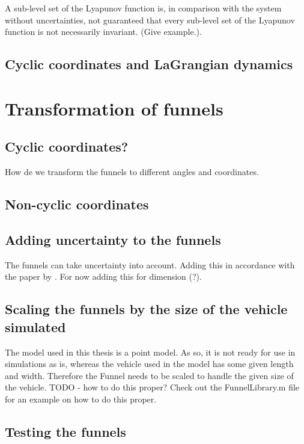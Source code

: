 A sub-level set of the Lyapunov function is, in comparison with the system
without uncertainties, not guaranteed that every sub-level set of the Lyapunov
function is not necessarily invariant. (Give example.).

\subsection{Cyclic coordinates and LaGrangian dynamics}



\section{Transformation of funnels}

\subsection{Cyclic coordinates?}

How de we transform the funnels to different angles and coordinates.

\subsection{Non-cyclic coordinates}

\subsection{Adding uncertainty to the funnels}

The funnels can take uncertainty into account. Adding this in accordance with
the paper by \cite{majumedar2013}. For now adding this for dimension (?).

\subsection{Scaling the funnels by the size of the vehicle simulated}

The model used in this thesis is a point model. As so, it is not ready for use
in simulations as is, whereas the vehicle used in the model has some given
length and width. Therefore the Funnel needs to be scaled to handle the given
size of the vehicle. TODO - how to do this proper? Check out the FunnelLibrary.m
file for an example on how to do this proper.

\subsection{Testing the funnels}

